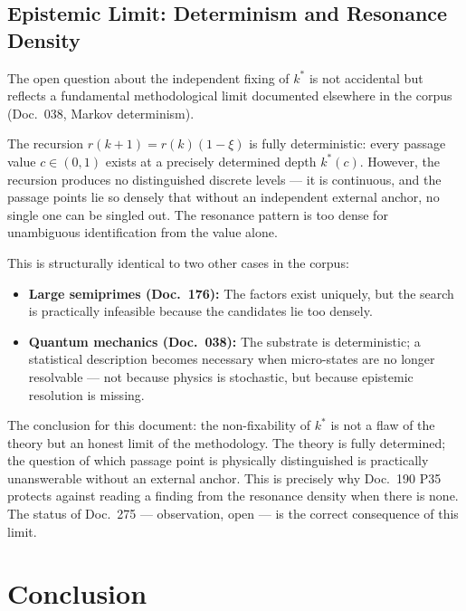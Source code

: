 \subsection{Epistemic Limit: Determinism and Resonance Density}

The open question about the independent fixing of $k^*$ is not
accidental but reflects a fundamental methodological limit documented
elsewhere in the corpus (Doc.~038, Markov determinism).

The recursion $r(k{+}1) = r(k)(1-\xi)$ is fully deterministic: every
passage value $c\in(0,1)$ exists at a precisely determined depth
$k^*(c)$. However, the recursion produces no distinguished discrete
levels --- it is continuous, and the passage points lie so densely
that without an independent external anchor, no single one can be
singled out. The resonance pattern is too dense for unambiguous
identification from the value alone.

This is structurally identical to two other cases in the corpus:
\begin{itemize}
  \item \textbf{Large semiprimes (Doc.~176):} The factors exist
        uniquely, but the search is practically infeasible because the
        candidates lie too densely.
  \item \textbf{Quantum mechanics (Doc.~038):} The substrate is
        deterministic; a statistical description becomes necessary when
        micro-states are no longer resolvable --- not because physics
        is stochastic, but because epistemic resolution is missing.
\end{itemize}

The conclusion for this document: the non-fixability of $k^*$ is not
a flaw of the theory but an honest limit of the methodology. The
theory is fully determined; the question of which passage point is
physically distinguished is practically unanswerable without an
external anchor. This is precisely why Doc.~190 P35 protects against
reading a finding from the resonance density when there is none.
The status of Doc.~275 --- observation, open --- is the correct
consequence of this limit.

\section{Conclusion}

